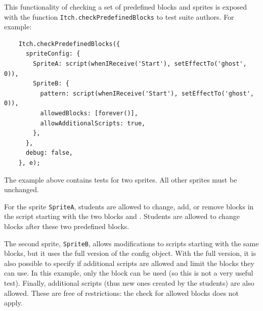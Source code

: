 \documentclass[../main]{subfiles}
\begin{document}
This functionality of checking a set of predefined blocks and sprites is exposed with the function \texttt{Itch.checkPredefinedBlocks} to test suite authors.
For example:

\begin{verbatim}
    Itch.checkPredefinedBlocks({
      spriteConfig: {
        SpriteA: script(whenIReceive('Start'), setEffectTo('ghost', 0)),
        SpriteB: {
          pattern: script(whenIReceive('Start'), setEffectTo('ghost', 0)),
          allowedBlocks: [forever()],
          allowAdditionalScripts: true,
        },
      },
      debug: false,
    }, e);
\end{verbatim}

The example above contains tests for two sprites.
All other sprites must be unchanged.

For the sprite \texttt{SpriteA}, students are allowed to change, add, or remove blocks in the script starting with the two blocks  and .
Students are allowed to change blocks after these two predefined blocks.

The second sprite, \texttt{SpriteB}, allows modifications to scripts starting with the same blocks, but it uses the full version of the config object.
With the full version, it is also possible to specify if additional scripts are allowed and limit the blocks they can use.
In this example, only the  block can be used (so this is not a very useful test).
Finally, additional scripts (thus new ones created by the students) are also allowed.
These are free of restrictions: the check for allowed blocks does not apply.
\end{document}
